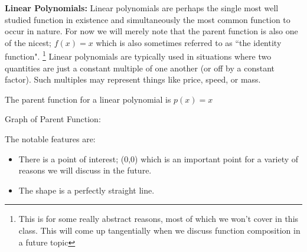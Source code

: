 \documentclass{ximera}
\begin{document}
        \textbf{Linear Polynomials:} Linear polynomials are perhaps the single most well studied function in existence and simultaneously the most common function to occur in nature. For now we will merely note that the parent function is also one of the nicest; $f(x) = x$ which is also sometimes referred to as ``the identity function".%
        \footnote{
            This is for some really abstract reasons, most of which we won't cover in this class. This will come up tangentially when we discuss function composition in a future topic
            }
        Linear polynomials are typically used in situations where two quantities are just a constant multiple of one another (or off by a constant factor). Such multiples may represent things like price, speed, or mass.
        \begin{description}
            \item[Parent Function:] The parent function for a linear polynomial is $p(x) = x$
            
            \begin{minipage}{\textwidth}\item[Graph of Parent Function:]\hspace*{0pt} \\
                \begin{center}
                \end{center}
            \end{minipage}
            
            \item[Notable Features of Graph:] The notable features are:
            \begin{itemize}
                \item There is a point of interest; (0,0) which is an important point for a variety of reasons we will discuss in the future. 
                \item The shape is a perfectly straight line.
            \end{itemize}
            

\end{description}
\end{document}

